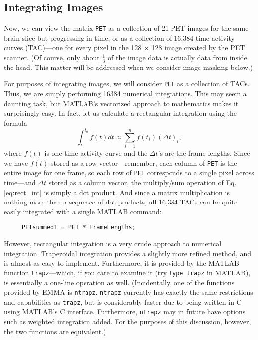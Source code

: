 \subsection{Integrating Images}

Now, we can view the matrix \verb|PET| as a collection of 21 PET
images for the same brain slice but progressing in time, or as a
collection of 16,384 time-activity curves (TAC)---one for every pixel
in the 128 $\times$ 128 image created by the PET scanner.  (Of course,
only about $\frac{1}{3}$ of the image data is actually data from
inside the head.  This matter will be addressed when we consider image
masking below.)

For purposes of integrating images, we will consider \verb|PET| as a
collection of TACs.  Thus, we are simply performing 16384 numerical
integrations.  This may seem a daunting task, but MATLAB's vectorized
approach to mathematics makes it surprisingly easy.  In fact, let us calculate a rectangular integration using the formula
\begin{equation}
\int_{t_{1}}^{t_{n}} f(t) dt \approx \sum_{i=1}^{n} f(t_{i}) (\Delta t)_{i},
\label{eq:rect_int}
\end{equation}
where $f(t)$ is one time-activity curve and the $\Delta t$'s are the frame
lengths.  Since we have $f(t)$ stored as a row vector---remember,
each column of \verb|PET| is the entire image for one frame, so each
row of \verb|PET| corresponds to a single pixel across time---and
$\Delta t$ stored as a column vector, the multiply/sum operation of
Eq. \ref{eq:rect_int} is simply a dot product.  And since a matrix
multiplication is nothing more than a sequence of dot products, all
16,384 TACs can be quite easily integrated with a single MATLAB
command:
\begin{verbatim}
     PETsummed1 = PET * FrameLengths;
\end{verbatim}

However, rectangular integration is a very crude approach to numerical
integration.  Trapezoidal integration provides a slightly more refined
method, and is almost as easy to implement.  Furthermore, it is
provided by the MATLAB function \verb|trapz|---which, if you care to
examine it (try \verb|type trapz| in MATLAB), is essentially a
one-line operation as well.  (Incidentally, one of the functions
provided by EMMA is \verb|ntrapz|.  \verb|ntrapz| currently has
exactly the same restrictions and capabilities as \verb|trapz|, but is
considerably faster due to being written in C using MATLAB's C
interface.  Furthermore, \verb|ntrapz| may in future have options such
as weighted integration added.  For the purposes of this discussion,
however, the two functions are equivalent.)

